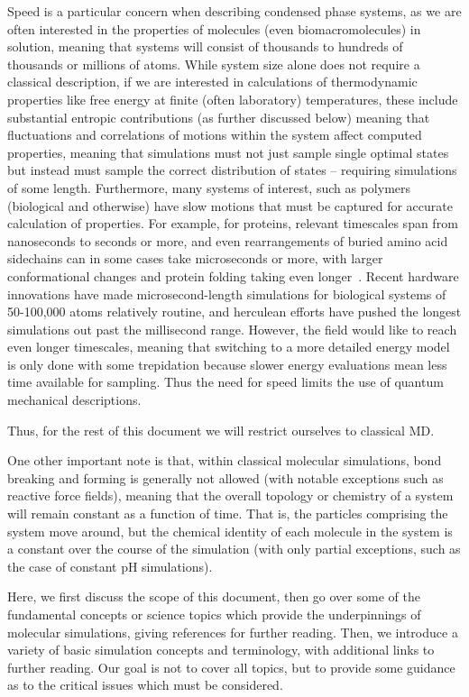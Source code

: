 \documentclass[9pt,bestpractices]{livecoms}
\begin{document}
Speed is a particular concern when describing condensed phase systems, as we are often interested in the properties of molecules (even biomacromolecules) in solution, meaning that systems will consist of thousands to hundreds of thousands or millions of atoms.
While system size alone does not require a classical description, if we are interested in calculations of thermodynamic properties like free energy at finite (often laboratory) temperatures, these include substantial entropic contributions (as further discussed below) meaning that fluctuations and correlations of motions within the system affect computed properties, meaning that simulations must not just sample single optimal states but instead must sample the correct distribution of states -- requiring simulations of some length.
Furthermore, many systems of interest, such as polymers (biological and otherwise) have slow motions that must be captured for accurate calculation of properties.
For example, for proteins, relevant timescales span from nanoseconds to seconds or more, and even rearrangements of buried amino acid sidechains can in some cases take microseconds or more, with larger conformational changes and protein folding taking even longer~\cite{Schlick:2010:, Mobley:2012:JComputAidedMolDes}. 
Recent hardware innovations have made microsecond-length simulations for biological systems of 50-100,000 atoms relatively routine, and herculean efforts have pushed the longest simulations out past the millisecond range.
However, the field would like to reach even longer timescales, meaning that switching to a more detailed energy model is only done with some trepidation because slower energy evaluations mean less time available for sampling. 
Thus the need for speed limits the use of quantum mechanical descriptions.

Thus, for the rest of this document we will restrict ourselves to classical MD.

One other important note is that, within classical molecular simulations, bond breaking and forming is generally not allowed (with notable exceptions such as reactive force fields),  meaning that the overall topology or chemistry of a system will remain constant as a function of time.
That is, the particles comprising the system move around, but the chemical identity of each molecule in the system is a constant over the course of the simulation (with only partial exceptions, such as the case of constant pH simulations).

Here, we first discuss the scope of this document, then go over some of the fundamental concepts or science topics which provide the underpinnings of molecular simulations, giving references for further reading.
Then, we introduce a variety of basic simulation concepts and terminology, with additional links to further reading.
Our goal is not to cover all topics, but to provide some guidance as to the critical issues which must be considered.
\end{document}
